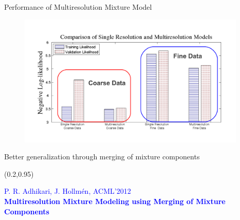 \documentclass[first=dgreen,second=purple,logo=redexc]{aaltoslides}
\newcommand\FrameText[1]{%
  \begin{textblock*}{0.98\textwidth}(0.2\textwidth,0.95\textheight)
    \textcolor {blue}{\scriptsize\raggedright #1\hspace{0.1\textwidth}}
  \end{textblock*}}
\begin{document}
\begin{frame}{Performance of Multiresolution Mixture Model}
\vspace{-8mm}
\begin{figure}
\centering
  \includegraphics[trim=1.2cm 0cm 0cm 1cm, clip=true, width=0.97\textwidth]{figures/nbarlkhood}  
\end{figure}

\vspace{-10mm}

\scriptsize \hspace{15mm} Better generalization through merging of mixture components

\FrameText{P. R. Adhikari, J. Hollm{\'e}n, ACML'2012 \\ \vspace{-1mm} \textbf{Multiresolution Mixture Modeling using Merging of Mixture Components}}
\end{frame}

\end{document}
